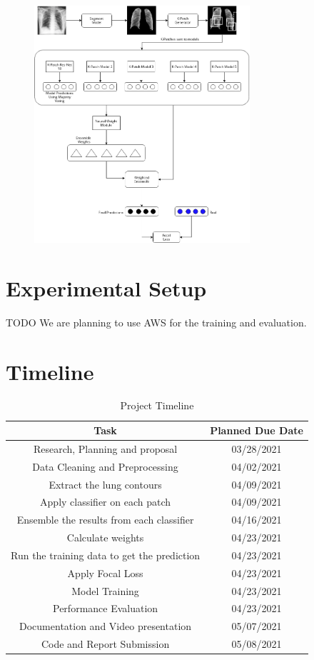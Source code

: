 \documentclass{sigkddExp}
\begin{document}
\begin{figure}[h]
    \includegraphics[width=8cm]{../doc/images/FLANNEL-IMPROVED.png}
\end{figure}


\section{Experimental Setup}
TODO
We are planning to use AWS for the training and evaluation.

\section{Timeline}


\begin{table}[H]
    \centering
    \caption{Project Timeline}
    \begin{tabular}{|c|c|} \hline
        Task&Planned Due Date\\ \hline
        Research, Planning and proposal &03/28/2021\\ \hline
        Data Cleaning and Preprocessing & 04/02/2021\\ \hline
        Extract the lung contours & 04/09/2021\\ \hline
        Apply classifier on each patch & 04/09/2021\\ \hline
        Ensemble the results from each classifier & 04/16/2021\\ \hline
        Calculate weights & 04/23/2021 \\ \hline
        Run the training data to get the prediction & 04/23/2021 \\ \hline
        Apply Focal Loss & 04/23/2021 \\ \hline
        Model Training & 04/23/2021 \\ \hline
        Performance Evaluation & 04/23/2021 \\ \hline
        Documentation and Video presentation & 05/07/2021 \\
        Code and Report Submission & 05/08/2021 \\
        \hline\end{tabular}
    \end{table}
    
    
    
    
\end{document}
